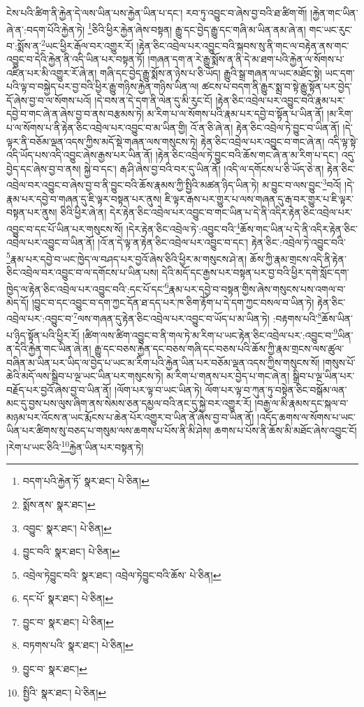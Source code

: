 ངེས་པའི་ཚིག་ནི་རྐྱེན་དེ་ལས་ཡིན་པས་རྐྱེན་ཡིན་པ་དང་། རབ་ཏུ་འབྱུང་བ་ཞེས་བྱ་བའི་ཐ་ཚིག་གོ། །རྐྱེན་གང་ཡིན་ཞེ་ན་:བདག་པོའི་རྐྱེན་ཏེ། \footnote{བདག་པའི་རྐྱེན་ཏོ་  སྣར་ཐང་།  པེ་ཅིན། }ཅིའི་ཕྱིར་རྐྱེན་ཞེས་བསྟན། རྒྱུ་དང་བྱེད་རྒྱུ་དང་གཞི་མ་ཡིན་ནམ་ཞེ་ན། གང་ཡང་རུང་བ་:སྨོས་ན་\footnote{སྨོས་ནས་  སྣར་ཐང་། }ཡང་ཕྱིར་རྒོལ་བར་འགྱུར་རོ། །རྟེན་ཅིང་འབྲེལ་པར་འབྱུང་བའི་སྐབས་སུ་ནི་གང་ལ་བརྟེན་ནས་གང་འབྱུང་བ་དེའི་རྐྱེན་ནི་འདི་ཡིན་པར་བསྟན་ཏོ། །གཞན་དག་ན་རེ་རྒྱུ་སྨོས་ན་ནི་དེ་མ་ཐག་པའི་རྐྱེན་ལ་སོགས་པ་འཛིན་པར་མི་འགྱུར་རོ་ཞེ་ན། གཞི་དང་བྱེད་རྒྱུ་སྨོས་ན་ཉེས་པ་ཅི་ཡོད། རྒྱུའི་སྒྲ་གཞན་ལ་ཡང་མཐོང་སྟེ། ཡང་དག་པའི་ལྟ་བ་བསྐྱེད་པར་བྱ་བའི་ཕྱིར་རྒྱུ་གཉིས་རྐྱེན་གཉིས་ཡིན་ལ། ཚངས་པ་བདག་ནི་རྒྱུར་སྨྲ་བ་སྟེ་རྒྱུ་སྟོན་པར་བྱེད་དོ་ཞེས་བྱ་བ་ལ་སོགས་པའོ། །དེ་བས་ན་དེ་དག་ནི་ལེན་དུ་མི་རུང་ངོ། །རྟེན་ཅིང་འབྲེལ་པར་འབྱུང་བའི་རྣམ་པར་དབྱེ་བ་གང་ཞེ་ན་ཞེས་བྱ་བ་ནས་བརྩམས་ཏེ། མ་རིག་པ་ལ་སོགས་པའི་རྣམ་པར་དབྱེ་བ་སྟོན་པ་ཡིན་ནོ། །མ་རིག་པ་ལ་སོགས་པ་ནི་རྟེན་ཅིང་འབྲེལ་པར་འབྱུང་བ་མ་ཡིན་གྱི། འོ་ན་ཅི་ཞེ་ན། རྟེན་ཅིང་འབྲེལ་ཏེ་བྱུང་བ་ཡིན་ནོ། །དེ་ལྟར་ནི་བཅོམ་ལྡན་འདས་ཀྱིས་མདོ་སྡེ་གཞན་ལས་གསུངས་ཏེ། རྟེན་ཅིང་འབྲེལ་པར་འབྱུང་བ་གང་ཞེ་ན། འདི་ལྟ་སྟེ་འདི་ཡོད་པས་འདི་འབྱུང་ཞེས་རྒྱས་པར་ཡིན་ནོ། །རྟེན་ཅིང་འབྲེལ་ཏེ་བྱུང་བའི་ཆོས་གང་ཞེ་ན་མ་རིག་པ་དང་། འདུ་བྱེད་དང་ཞེས་བྱ་བ་ནས། སྐྱེ་བ་དང་། རྒ་ཤི་ཞེས་བྱ་བའི་བར་དུ་ཡིན་ནོ། །འདི་ལ་དགོངས་པ་ཅི་ཡོད་ཅེ་ན། རྟེན་ཅིང་འབྲེལ་བར་འབྱུང་བ་ཞེས་བྱ་བ་ནི་བྱུང་བའི་ཆོས་རྣམས་ཀྱི་སྤྱིའི་མཚན་ཉིད་ཡིན་ཏེ། མ་བྱུང་བ་ལས་བྱུང་\footnote{འབྱུང་  སྣར་ཐང་།  པེ་ཅིན། }བའོ། །དེ་རྣམ་པར་དབྱེ་བ་གཞན་དུ་ཇི་ལྟར་བསྟན་པར་ནུས། ཇི་ལྟར་རྒས་པར་གྱུར་པ་ལས་གཞན་དུ་རྒ་བར་གྱུར་པ་ཇི་ལྟར་བསྟན་པར་ནུས། ཅིའི་ཕྱིར་ཞེ་ན། དེར་རྟེན་ཅིང་འབྲེལ་པར་འབྱུང་བ་གང་ཡིན་པ་དེ་ནི་འདིར་རྟེན་ཅིང་འབྲེལ་པར་འབྱུང་བ་དང་པོ་ཡིན་པར་གསུངས་སོ། །དེར་རྟེན་ཅིང་འབྲེལ་ཏེ་:འབྱུང་བའི་\footnote{བྱུང་བའི་  སྣར་ཐང་།  པེ་ཅིན། }ཆོས་གང་ཡིན་པ་དེ་ནི་འདིར་རྟེན་ཅིང་འབྲེལ་པར་འབྱུང་བ་ཡིན་ནོ། །འོ་ན་དེ་ལྟ་ན་རྟེན་ཅིང་འབྲེལ་པར་འབྱུང་བ་དང་། རྟེན་ཅིང་:འབྲེལ་ཏེ་འབྱུང་བའི་\footnote{འབྲེལ་ཏེབྱུང་བའི་  སྣར་ཐང་། འབྲེལ་ཏེབྱུང་བའི་ཆོས་  པེ་ཅིན། }རྣམ་པར་དབྱེ་བ་ཡང་ཁྱེད་ལ་བཤད་པར་བྱའོ་ཞེས་ཅིའི་ཕྱིར་མ་གསུངས་ཤེ་ན། ཆོས་ཀྱི་རྣམ་གྲངས་འདི་ནི་རྟེན་ཅིང་འབྲེལ་བར་འབྱུང་བ་ལ་དགོངས་པ་ཡིན་པས། དེའི་མདོ་དང་རྒྱས་པར་བསྟན་པར་བྱ་བའི་ཕྱིར་དགེ་སློང་དག་ཁྱེད་ལ་རྟེན་ཅིང་འབྲེལ་པར་འབྱུང་བའི་:དང་པོ་དང་\footnote{དང་པོ་  སྣར་ཐང་།  པེ་ཅིན། }རྣམ་པར་དབྱེ་བ་བསྟན་གྱིས་ཞེས་གསུངས་པས་འགལ་བ་མེད་དོ། །བྱུང་བ་དང་འབྱུང་བ་དག་ཀྱང་དོན་ཐ་དད་པར་ཁ་ཅིག་རྟོག་པ་དེ་དག་ཀྱང་བསལ་བ་ཡིན་ཏེ། རྟེན་ཅིང་འབྲེལ་པར་:འབྱུང་བ་\footnote{བྱུང་བ་  སྣར་ཐང་།  པེ་ཅིན། }ལས་གཞན་དུ་རྟེན་ཅིང་འབྲེལ་པར་འབྱུང་བ་ཡོད་པ་མ་ཡིན་ཏེ། :བརྟགས་པའི་\footnote{བཏགས་པའི་  སྣར་ཐང་།  པེ་ཅིན། }ཆོས་ཡིན་པ་ཉིད་སྟོན་པའི་ཕྱིར་རོ། །ཚིག་ལས་ཚིག་འབྱུང་བ་ནི་གལ་ཏེ་མ་རིག་པ་ཡང་རྟེན་ཅིང་འབྲེལ་པར་:འབྱུང་བ་\footnote{བྱུང་བ་  སྣར་ཐང་། }ཡིན་ན་དེའི་རྐྱེན་གང་ཡིན་ཞེ་ན། རྒྱུ་དང་བཅས་རྐྱེན་དང་བཅས་གཞི་དང་བཅས་པའི་ཆོས་ཀྱི་རྣམ་གྲངས་ལས་ཚུལ་བཞིན་མ་ཡིན་པར་ཡིད་ལ་བྱེད་པ་ཡང་མ་རིག་པའི་རྐྱེན་ཡིན་པར་བཅོམ་ལྡན་འདས་ཀྱིས་གསུངས་སོ། །གསུས་པོ་ཆེའི་མདོ་ལས་སྒྲིབ་པ་ལྔ་ཡང་ཡིན་པར་གསུངས་ཏེ། མ་རིག་པ་གནས་པར་བྱེད་པ་གང་ཞེ་ན། སྒྲིབ་པ་ལྔ་ཡིན་པར་བརྗོད་པར་བྱའོ་ཞེས་བྱ་བ་ཡིན་ནོ། །ལོག་པར་ལྟ་བ་ཡང་ཡིན་ཏེ། ལོག་པར་ལྟ་བ་ཀུན་ཏུ་བསྟེན་ཅིང་བསྒོམ་ལན་མང་དུ་བྱས་པས་ལུས་ཞིག་ནས་སེམས་ཅན་དམྱལ་བའི་ནང་དུ་སྐྱེ་བར་འགྱུར་རོ། །བརྒྱ་ལ་མི་རྣམས་དང་སྐལ་བ་མཉམ་པར་འོངས་ན་ཡང་རྨོངས་པ་ཆེན་པོར་འགྱུར་བ་ཡིན་ནོ་ཞེས་བྱ་བ་ཡིན་ནོ། །འདོད་ཆགས་ལ་སོགས་པ་ཡང་ཡིན་པར་ཚིགས་སུ་བཅད་པ་གསུམ་ལས་ཆགས་པ་པོས་ནི་མི་ཤེས། ཆགས་པ་པོས་ནི་ཆོས་མི་མཐོང་ཞེས་འབྱུང་ངོ། །རེག་པ་ཡང་ཅིའི་\footnote{སྤྱིའི་  སྣར་ཐང་།  པེ་ཅིན། }རྐྱེན་ཡིན་པར་བསྟན་ཏེ། 